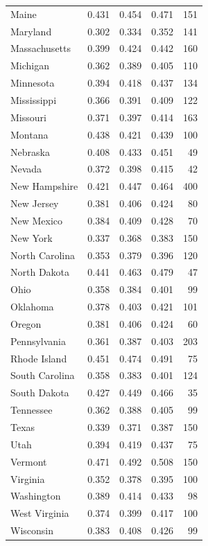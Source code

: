 \begin{table}[htbp]
\begin{threeparttable}
\begin{tabular}{lrrrr}
Maine        & 0.431 & 0.454 & 0.471 & 151 \\
Maryland     & 0.302 & 0.334 & 0.352 & 141 \\
Massachusetts & 0.399 & 0.424 & 0.442 & 160 \\
Michigan     & 0.362 & 0.389 & 0.405 & 110 \\
Minnesota    & 0.394 & 0.418 & 0.437 & 134 \\
Mississippi  & 0.366 & 0.391 & 0.409 & 122 \\
Missouri     & 0.371 & 0.397 & 0.414 & 163 \\
Montana      & 0.438 & 0.421 & 0.439 & 100 \\
Nebraska     & 0.408 & 0.433 & 0.451 & 49  \\
Nevada       & 0.372 & 0.398 & 0.415 & 42  \\
New Hampshire & 0.421 & 0.447 & 0.464 & 400 \\
New Jersey   & 0.381 & 0.406 & 0.424 & 80  \\
New Mexico   & 0.384 & 0.409 & 0.428 & 70  \\
New York     & 0.337 & 0.368 & 0.383 & 150 \\
North Carolina & 0.353 & 0.379 & 0.396 & 120 \\
North Dakota & 0.441 & 0.463 & 0.479 & 47  \\
Ohio         & 0.358 & 0.384 & 0.401 & 99  \\
Oklahoma     & 0.378 & 0.403 & 0.421 & 101 \\
Oregon       & 0.381 & 0.406 & 0.424 & 60  \\
Pennsylvania & 0.361 & 0.387 & 0.403 & 203 \\
Rhode Island & 0.451 & 0.474 & 0.491 & 75  \\
South Carolina & 0.358 & 0.383 & 0.401 & 124 \\
South Dakota & 0.427 & 0.449 & 0.466 & 35  \\
Tennessee    & 0.362 & 0.388 & 0.405 & 99  \\
Texas        & 0.339 & 0.371 & 0.387 & 150 \\
Utah         & 0.394 & 0.419 & 0.437 & 75  \\
Vermont      & 0.471 & 0.492 & 0.508 & 150 \\
Virginia     & 0.352 & 0.378 & 0.395 & 100 \\
Washington   & 0.389 & 0.414 & 0.433 & 98  \\
West Virginia & 0.374 & 0.399 & 0.417 & 100 \\
Wisconsin    & 0.383 & 0.408 & 0.426 & 99  \\

\end{tabular}
\end{threeparttable}
\end{table}
